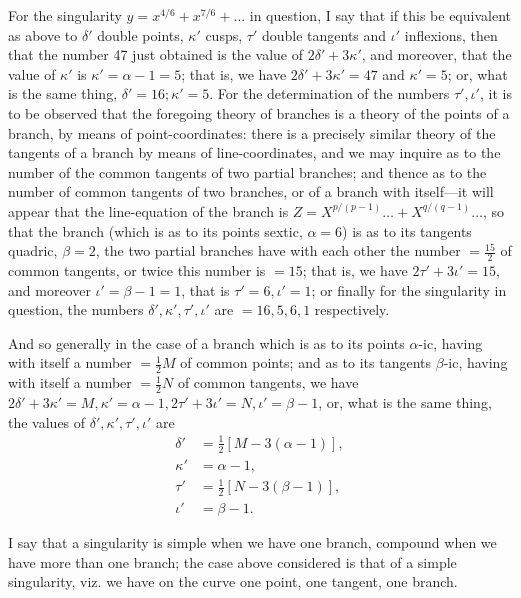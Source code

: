 \documentclass[11pt]{article}
\begin{document}
For the singularity $y = x^{4/6} + x^{7/6} + \ldots$ in question, I say that if this be equivalent as above to $\delta'$ double points, $\kappa'$ cusps, $\tau'$ double tangents and $\iota'$ inflexions, then that the number 47 just obtained is the value of $2\delta' + 3\kappa'$, and moreover, that the value of $\kappa'$ is $\kappa' = \alpha - 1 = 5$; that is, we have $2\delta' + 3\kappa' = 47$ and $\kappa' = 5$; or, what is the same thing, $\delta' = 16; \kappa' = 5$. For the determination of the numbers $\tau', \iota'$, it is to be observed that the foregoing theory of branches is a theory of the points of a branch, by means of point-coordinates: there is a precisely similar theory of the tangents of a branch by means of line-coordinates, and we may inquire as to the number of the common tangents of two partial branches; and thence as to the number of common tangents of two branches, or of a branch with itself---it will appear that the line-equation of the branch is $Z = X^{p/(p-1)} \ldots + X^{q/(q-1)}\ldots$, so that the branch (which is as to its points sextic, $\alpha = 6$) is as to its tangents quadric, $\beta = 2$, the two partial branches have with each other the number $= \tfrac{15}{2}$ of common tangents, or twice this number is $= 15$; that is, we have $2\tau' + 3\iota' = 15$, and moreover $\iota' = \beta - 1 = 1$, that is $\tau' = 6, \iota' = 1$; or finally for the singularity in question, the numbers $\delta', \kappa', \tau', \iota'$ are $= 16, 5, 6, 1$ respectively.

And so generally in the case of a branch which is as to its points $\alpha$-ic, having with itself a number $= \tfrac{1}{2}M$ of common points; and as to its tangents $\beta$-ic, having with itself a number $= \tfrac{1}{2}N$ of common tangents, we have $2\delta' + 3\kappa' = M, \kappa' = \alpha - 1, 2\tau' + 3\iota' = N, \iota' = \beta - 1$, or, what is the same thing, the values of $\delta', \kappa', \tau', \iota'$ are
\begin{align*}
\delta' &= \tfrac{1}{2}[M - 3(\alpha - 1)],\\
\kappa' &= \alpha - 1,\\
\tau' &= \tfrac{1}{2}[N - 3(\beta - 1)],\\
\iota' &= \beta - 1.
\end{align*}

I say that a singularity is simple when we have one branch, compound when we have more than one branch; the case above considered is that of a simple singularity, viz. we have on the curve one point, one tangent, one branch.
\end{document}
